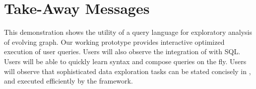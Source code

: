 \section{Take-Away Messages}
\label{sec:conc}

This demonstration shows the utility of a query language for
exploratory analysis of evolving graph.  Our working prototype
provides interactive optimized execution of user queries.  Users will
also observe the integration of \ql with SQL.  Users will be
able to quickly learn \ql syntax and compose queries on the fly.
Users will observe that sophisticated data exploration tasks can be
stated concisely in \ql, and executed efficiently by the framework.
